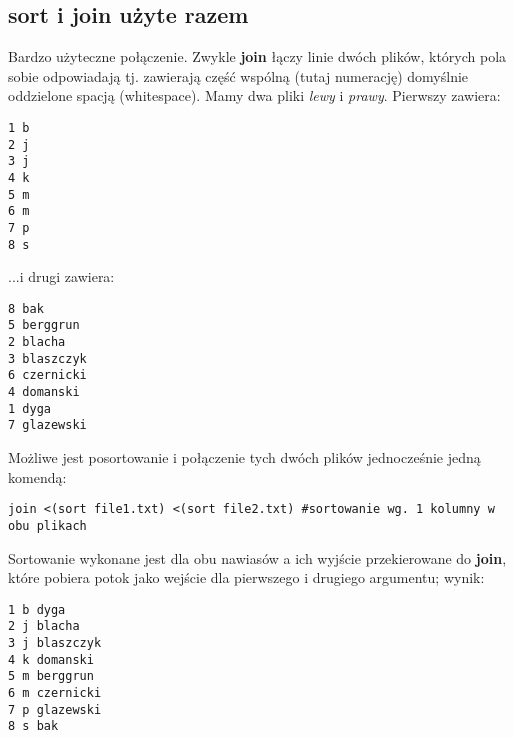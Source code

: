 \documentclass[a4paper,titlepage,12pt]{mwart}
\begin{document}
\subsection{\textbf{sort} i \textbf{join} użyte razem}
Bardzo użyteczne połączenie. Zwykle \textbf{join} łączy linie dwóch plików, których pola sobie odpowiadają tj. zawierają część wspólną (tutaj numerację) domyślnie oddzielone spacją (whitespace). Mamy dwa pliki \textit{lewy} i \textit{prawy}. Pierwszy zawiera:
\begin{verbatim}
1 b
2 j
3 j
4 k
5 m
6 m
7 p
8 s
\end{verbatim}
...i drugi zawiera:
\begin{verbatim}
8 bak
5 berggrun
2 blacha
3 blaszczyk
6 czernicki
4 domanski
1 dyga
7 glazewski
\end{verbatim}
Możliwe jest posortowanie i połączenie tych dwóch plików jednocześnie jedną komendą:
\begin{verbatim}
join <(sort file1.txt) <(sort file2.txt) #sortowanie wg. 1 kolumny w obu plikach
\end{verbatim}
Sortowanie wykonane jest dla obu nawiasów a ich wyjście przekierowane do \textbf{join}, które pobiera potok jako wejście dla pierwszego i drugiego argumentu; wynik:
\begin{verbatim}
1 b dyga
2 j blacha
3 j blaszczyk
4 k domanski
5 m berggrun
6 m czernicki
7 p glazewski
8 s bak
\end{verbatim}
\end{document}

